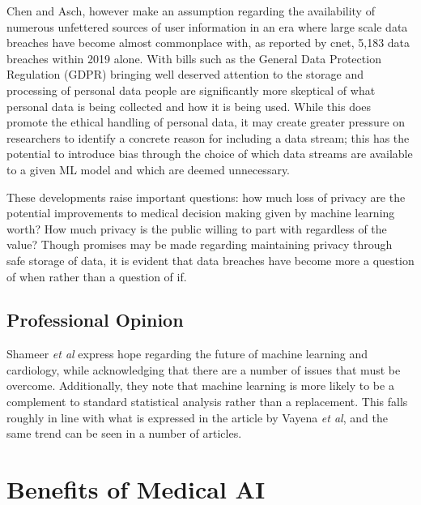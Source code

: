 \documentclass[]{article}
\begin{document}
			Chen and Asch, however make an assumption regarding the availability of numerous unfettered sources of user information in an era where large scale data breaches have become almost commonplace with, as reported by cnet, 5,183 data breaches within 2019 alone.\cite{cnet2019databreaches} With bills such as the General Data Protection Regulation (GDPR) bringing well deserved attention to the storage and processing of personal data people are significantly more skeptical of what personal data is being collected and how it is being used.\cite{Vayena2018} While this does promote the ethical handling of personal data, it may create greater pressure on researchers to identify a concrete reason for including a data stream; this has the potential to introduce bias through the choice of which data streams are available to a given ML model and which are deemed unnecessary.\cite{Gianfrancesco2018}
			
			These developments raise important questions: how much loss of privacy are the potential improvements to medical decision making given by machine learning worth? How much privacy is the public willing to part with regardless of the value? Though promises may be made regarding maintaining privacy through safe storage of data, it is evident that data breaches have become more a question of when rather than a question of if.

		\subsection{Professional Opinion}

			Shameer \emph{et al} express hope regarding the future of machine learning and cardiology, while acknowledging that there are a number of issues that must be overcome. Additionally, they note that machine learning is more likely to be a complement to standard statistical analysis rather than a replacement.\cite{Shameer1156} This falls roughly in line with what is expressed in the article by Vayena \emph{et al}\cite{Vayena2018}, and the same trend can be seen in a number of articles.\cite{Shah2018,WU201868}

	\section{Benefits of Medical AI}
\end{document}
